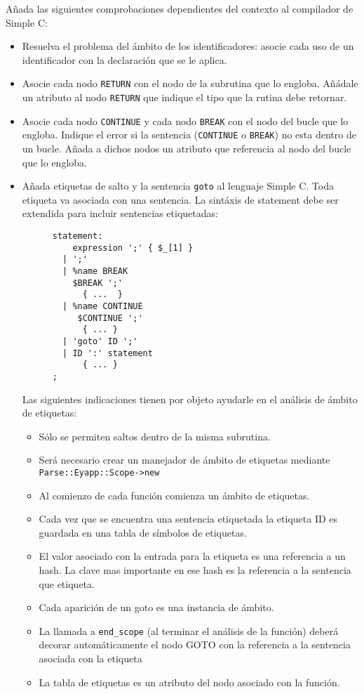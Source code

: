 Añada las siguientes comprobaciones dependientes del contexto al compilador
de Simple C:
\begin{itemize}
\item
Resuelva el problema del ámbito de los identificadores: asocie cada uso de un identificador
con la declaración que se le aplica.
\item
Asocie cada nodo \verb|RETURN| con el nodo de la subrutina que lo engloba.
Añádale un atributo al nodo \verb|RETURN| que indique el tipo que la rutina debe retornar.
\item
Asocie cada nodo \verb|CONTINUE| y cada nodo \verb|BREAK| con el nodo
del bucle que lo engloba. Indique el error si la sentencia (\verb|CONTINUE|
o \verb|BREAK|) no esta dentro de un bucle. Añada  a dichos nodos
un atributo 
que referencia al nodo del bucle que lo engloba.
\item
Añada etiquetas de salto y la sentencia \verb|goto| al lenguaje Simple C.
Toda etiqueta va asociada con una sentencia.
      La sintáxis de statement debe ser extendida para incluir sentencias etiquetadas:


\begin{verbatim}
      statement:
          expression ';' { $_[1] }
        | ';'
        | %name BREAK
          $BREAK ';'
            { ...  }
        | %name CONTINUE
           $CONTINUE ';'
            { ... }
        | 'goto' ID ';'
        | ID ':' statement
            { ... }
      ;
\end{verbatim}

 Las siguientes indicaciones tienen por objeto ayudarle en el análisis de ámbito de etiquetas:
\begin{itemize}
          \item Sólo se permiten saltos dentro de la misma subrutina.
          \item Será necesario crear un manejador de ámbito de etiquetas mediante \verb|Parse::Eyapp::Scope->new|
          \item Al comienzo de cada función comienza un ámbito de etiquetas.
          \item Cada vez que se encuentra una sentencia etiquetada la etiqueta 
                ID es guardada en una tabla de símbolos de etiquetas.
          \item El valor asociado con la entrada para la etiqueta es una referencia a un hash. La clave mas importante en ese hash es la referencia a la sentencia que etiqueta.
          \item Cada aparición de un goto es una instancia de ámbito.
          \item La llamada a \verb|end_scope| (al terminar el análisis de la función) deberá decorar automáticamente el nodo GOTO con la referencia a la sentencia asociada con la etiqueta
          \item La tabla de etiquetas es un atributo del nodo asociado con la función.
\end{itemize}

\end{itemize}


